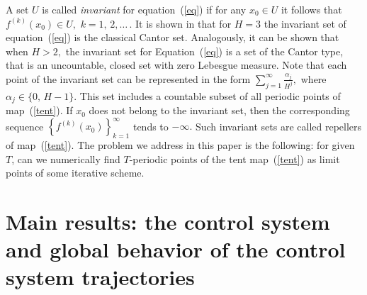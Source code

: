 \documentclass[12pt,a4paper]{amsart}
\begin{document}


%
A set $U$ is called {\it invariant} for equation~(\ref{eq}) if for any $x_0\in U$ it follows that $f^{(k)}(x_0)\in U,$ $k=1,\,2,\ldots\,.$ It is shown in \cite{Leonov}
that for $H=3$ the invariant set of equation~(\ref{eq}) is the classical Cantor set. Analogously, it can be shown that when $H>2,$ the invariant set for Equation~(\ref{eq}) 
is a set of the Cantor type, that is an uncountable, closed set with zero Lebesgue measure. Note that each point of the invariant 
set can be represented in the form $\sum\limits_{j=1}^{\infty}{\frac{\alpha_j}{H^j}},$ where $\alpha_j\in\{0,\,H-1\}.$ This set includes a countable subset 
of all periodic points of map~(\ref{tent}). If $x_0$ does not belong to the invariant set, then the corresponding sequence 
$\left\{f^{(k)}(x_0)\right\}_{k=1}^{\infty}$ tends to $-\infty.$ Such invariant sets are called repellers of map~(\ref{tent}). 
% 
The problem we address in this paper is the following: 
for given $T$, can we numerically find $T$-periodic points of the tent map~(\ref{tent}) as limit points of some iterative scheme.



\section{Main results: the control system and global behavior of the control system trajectories} \label{sec:ControlSystem}
\end{document}
